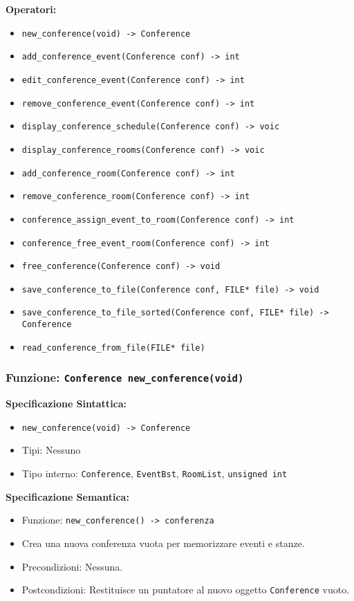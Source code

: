\documentclass[11pt]{scrartcl} %
\begin{document}
\textbf{Operatori:} 
\begin{itemize}
    \item \texttt{new\_conference(void) -> Conference}
    \item \texttt{add\_conference\_event(Conference conf) -> int}
    \item \texttt{edit\_conference\_event(Conference conf) -> int}
    \item \texttt{remove\_conference\_event(Conference conf) -> int}
    \item \texttt{display\_conference\_schedule(Conference conf) -> voic}
    \item \texttt{display\_conference\_rooms(Conference conf) -> voic}
    \item \texttt{add\_conference\_room(Conference conf) -> int}
    \item \texttt{remove\_conference\_room(Conference conf) -> int}
    \item \texttt{conference\_assign\_event\_to\_room(Conference conf) -> int}
    \item \texttt{conference\_free\_event\_room(Conference conf) -> int}
    \item \texttt{free\_conference(Conference conf) -> void}
    \item \texttt{save\_conference\_to\_file(Conference conf, FILE* file) -> void}
    \item \texttt{save\_conference\_to\_file\_sorted(Conference conf, FILE* file) -> Conference}
    \item \texttt{read\_conference\_from\_file(FILE* file)}
\end{itemize}

\subsubsection{Funzione: \texttt{Conference new\_conference(void)}}

\textbf{Specificazione Sintattica:}
\begin{itemize}
\item \texttt{new\_conference(void) -> Conference}
\item Tipi: Nessuno
\item Tipo interno: \texttt{Conference}, \texttt{EventBst}, \texttt{RoomList}, \texttt{unsigned int}
\end{itemize}

\textbf{Specificazione Semantica:}
\begin{itemize}
\item Funzione: \texttt{new\_conference() -> conferenza}
\item Crea una nuova conferenza vuota per memorizzare eventi e stanze.
\item Precondizioni: Nessuna.
\item Postcondizioni: Restituisce un puntatore al nuovo oggetto \texttt{Conference} vuoto.
\end{itemize}
\end{document}
